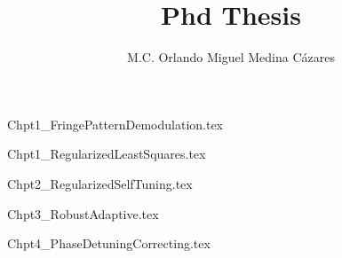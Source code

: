 \documentclass[letterpaper,12pt]{book}
\title{Phd Thesis}
\author{M.C. Orlando Miguel Medina C\'azares}
\begin{document}
\maketitle

\clearpage
\thispagestyle{empty}

\tableofcontents
{}
\listoffigures

\mainmatter
{Chpt1_FringePatternDemodulation.tex}

{Chpt1_RegularizedLeastSquares.tex}

{Chpt2_RegularizedSelfTuning.tex}

{Chpt3_RobustAdaptive.tex}

{Chpt4_PhaseDetuningCorrecting.tex}


\medskip

\end{document}
